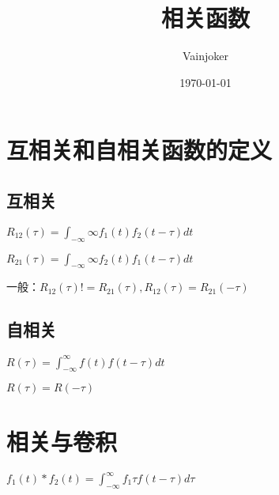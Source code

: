\documentclass{article}
\title{相关函数}
\author{Vainjoker}
\date{\today}
\begin{document}
    \maketitle
    \newpage
   
    \section{互相关和自相关函数的定义}
    
    \subsection{互相关}
    $R_{12}(\tau)=\int_{-\infty}{\infty}f_1(t)f_2(t-\tau)dt$

    $R_{21}(\tau)=\int_{-\infty}{\infty}f_2(t)f_1(t-\tau)dt$


    一般：$R_{12}(\tau)!=R_{21}(\tau),R_{12}(\tau)=R_{21}(-\tau)$
    
    \subsection{自相关}
    $R(\tau)=\int_{-\infty}^{\infty}f(t)f(t-\tau)dt$

    $R(\tau)=R(-\tau)$

    \section{相关与卷积}

    $f_1(t)*f_2(t)=\int_{-\infty}^{\infty}f_1{\tau}f(t-\tau)d\tau$
\end{document}
